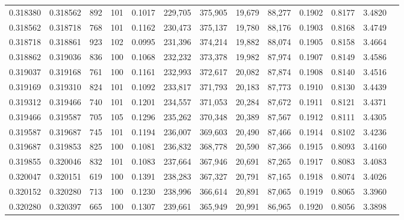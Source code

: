 \begin{tabular}{rrrrrrrrrrrrr}
0.318380 & 0.318562 &   892 & 101 &                                     0.1017 & 229,705 & 375,905 &  19,679 &  88,277 & 0.1902 & 0.8177 & 3.4820 \\
0.318562 & 0.318718 &   768 & 101 &                                     0.1162 & 230,473 & 375,137 &  19,780 &  88,176 & 0.1903 & 0.8168 & 3.4749 \\
0.318718 & 0.318861 &   923 & 102 &                                     0.0995 & 231,396 & 374,214 &  19,882 &  88,074 & 0.1905 & 0.8158 & 3.4664 \\
0.318862 & 0.319036 &   836 & 100 &                                     0.1068 & 232,232 & 373,378 &  19,982 &  87,974 & 0.1907 & 0.8149 & 3.4586 \\
0.319037 & 0.319168 &   761 & 100 &                                     0.1161 & 232,993 & 372,617 &  20,082 &  87,874 & 0.1908 & 0.8140 & 3.4516 \\
0.319169 & 0.319310 &   824 & 101 &                                     0.1092 & 233,817 & 371,793 &  20,183 &  87,773 & 0.1910 & 0.8130 & 3.4439 \\
0.319312 & 0.319466 &   740 & 101 &                                     0.1201 & 234,557 & 371,053 &  20,284 &  87,672 & 0.1911 & 0.8121 & 3.4371 \\
0.319466 & 0.319587 &   705 & 105 &                                     0.1296 & 235,262 & 370,348 &  20,389 &  87,567 & 0.1912 & 0.8111 & 3.4305 \\
0.319587 & 0.319687 &   745 & 101 &                                     0.1194 & 236,007 & 369,603 &  20,490 &  87,466 & 0.1914 & 0.8102 & 3.4236 \\
0.319687 & 0.319853 &   825 & 100 &                                     0.1081 & 236,832 & 368,778 &  20,590 &  87,366 & 0.1915 & 0.8093 & 3.4160 \\
0.319855 & 0.320046 &   832 & 101 &                                     0.1083 & 237,664 & 367,946 &  20,691 &  87,265 & 0.1917 & 0.8083 & 3.4083 \\
0.320047 & 0.320151 &   619 & 100 &                                     0.1391 & 238,283 & 367,327 &  20,791 &  87,165 & 0.1918 & 0.8074 & 3.4026 \\
0.320152 & 0.320280 &   713 & 100 &                                     0.1230 & 238,996 & 366,614 &  20,891 &  87,065 & 0.1919 & 0.8065 & 3.3960 \\
0.320280 & 0.320397 &   665 & 100 &                                     0.1307 & 239,661 & 365,949 &  20,991 &  86,965 & 0.1920 & 0.8056 & 3.3898 \\

\end{tabular}
